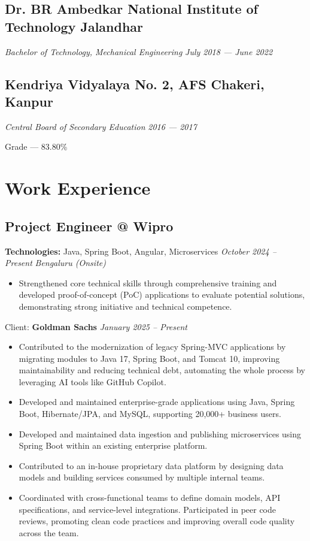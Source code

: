 \documentclass[a4paper]{article}
\begin{document}
\subsection{Dr. BR Ambedkar National Institute of Technology Jalandhar}
\textit{Bachelor of Technology, Mechanical Engineering}
\hfill
\textit{July 2018 --- June 2022}


\subsection{Kendriya Vidyalaya No. 2, AFS Chakeri, Kanpur}
\textit{Central Board of Secondary Education}
\hfill
\textit{2016 --- 2017}

Grade --- 83.80\%

\section{Work Experience}

\subsection{Project Engineer @ Wipro}
\vspace{3pt}
\textbf{Technologies:}
Java, Spring Boot, Angular, Microservices
\hfill
\textit{October 2024 -- Present}
\textbar
\textit{ Bengaluru (Onsite)}

\begin{itemize}
	\item Strengthened core technical skills through comprehensive training and developed proof-of-concept (PoC) applications to evaluate potential solutions, demonstrating strong initiative and technical competence.
\end{itemize}

Client:
\textbf{Goldman Sachs}
\hfill
\textit{January 2025 -- Present}
\begin{itemize}
	\item Contributed to the modernization of legacy Spring-MVC applications by migrating modules to Java 17, Spring Boot, and Tomcat 10, improving maintainability and reducing technical debt, automating the whole process by leveraging AI tools like GitHub Copilot.
	\item Developed and maintained enterprise-grade applications using Java, Spring Boot, Hibernate/JPA, and MySQL, supporting 20,000+ business users.
	\item Developed and maintained data ingestion and publishing microservices using Spring Boot within an existing enterprise platform.
	\item Contributed to an in-house proprietary data platform by designing data models and building services consumed by multiple internal teams.
	\item Coordinated with cross-functional teams to define domain models, API specifications, and service-level integrations. Participated in peer code reviews, promoting clean code practices and improving overall code quality across the team.
\end{itemize}
\end{document}
